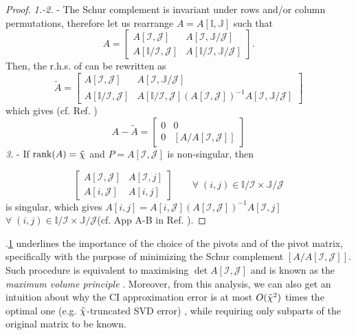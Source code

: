 \begin{proof}
	\textit{1.-2.} - The Schur complement is invariant under rows and/or column permutations, therefore let us rearrange $A = A[\mathds{I}, \mathds{J}]$ such that
	\begin{equation*}
		A = \begin{bmatrix}
			A[\mathcal{I}, \mathcal{J}] & A[\mathcal{I}, \mathds{J} / \mathcal{J}] \\
			A[\mathds{I} / \mathcal{I}, \mathcal{J}]  & A[\mathds{I} / \mathcal{I}, \mathds{J} / \mathcal{J}]  
		\end{bmatrix}.
	\end{equation*}
Then, the r.h.s. of  can be rewritten as 
	\begin{equation*}
		\tilde{A} = \begin{bmatrix}
			A[\mathcal{I}, \mathcal{J}] & A[\mathcal{I}, \mathds{J} / \mathcal{J}] \\
			A[\mathds{I} / \mathcal{I}, \mathcal{J}]  &   A[\mathds{I} / \mathcal{I}, \mathcal{J}] \left(A[\mathcal{I}, \mathcal{J}] \right)^{-1} A[\mathcal{I}, \mathds{J} / \mathcal{J}]
		\end{bmatrix}
	\end{equation*}
	which gives (cf. Ref. \cite{Fernandez2024})
	\begin{equation}
		A - \tilde{A} = \begin{bmatrix}
			0 & 0 \\
			0 & [A/A[\mathcal{I}, \mathcal{J}]]
		\end{bmatrix}
	\end{equation}
\textit{3.} - If $\operatorname{rank}\!\left(A\right) = {\tilde \chi}$ and $P = A[\mathcal{I},\mathcal{J}]$ is non-singular, then 

\begin{equation}
	\begin{bmatrix}
		A[\mathcal{I}, \mathcal{J}] & A[\mathcal{I},j] \\
		A[i, \mathcal{J}] & A[i,j]
	\end{bmatrix}\qquad \forall\; (i,j) \in \mathds{I} / \mathcal{I} \times \mathds{J} / \mathcal{J}
\end{equation}
is singular, which gives $ A[i,j] = A[i, \mathcal{J}] \left( A[\mathcal{I}, \mathcal{J}] \right)^{-1} A[\mathcal{I},j]$ $\forall\; (i,j) \in \mathds{I} / \mathcal{I} \times \mathds{J} / \mathcal{J}$(cf. App A-B in Ref. \cite{Fernandez2022}). 
\end{proof}

.\hyperlink{cond:rankexact}{1} underlines the importance of the choice of the pivots and of the pivot matrix, specifically with the purpose of minimizing the Schur complement $[A/A[\mathcal{I}, \mathcal{J}]]$. Such procedure is equivalent to maximising $\det{A[\mathcal{I}, \mathcal{J}]}$ and is known as the \textit{maximum volume principle} \cite{Goreinov1997}. Moreover, from this analysis, we can also get an intuition about why the CI approximation error is at most $O({\tilde \chi}^2)$ times the optimal one (e.g. ${\tilde \chi}$-truncated SVD error) \cite{Schneider2010}, while requiring only subparts of the original matrix to be known. 

